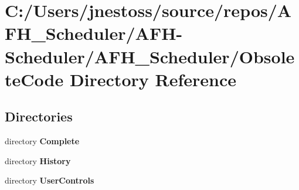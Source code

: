 \section{C\+:/\+Users/jnestoss/source/repos/\+A\+F\+H\+\_\+\+Scheduler/\+A\+F\+H-\/\+Scheduler/\+A\+F\+H\+\_\+\+Scheduler/\+Obsolete\+Code Directory Reference}
\label{dir_7dd01f046ea4a7735e0c2f221a26ce00}
\subsection*{Directories}
\begin{DoxyCompactItemize}
\item 
directory \textbf{ Complete}
\item 
directory \textbf{ History}
\item 
directory \textbf{ User\+Controls}
\end{DoxyCompactItemize}
